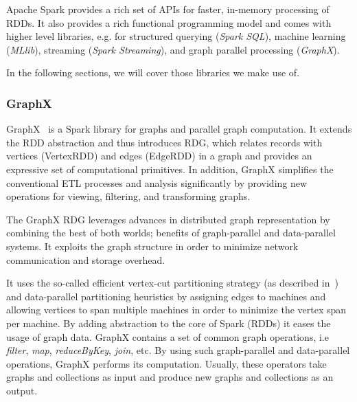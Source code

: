 Apache Spark provides a rich set of \gls{API}s for faster, in-memory processing of \gls{RDD}s.
It also provides a rich functional programming model and comes with higher level libraries, e.g. for structured querying (\textit{Spark SQL}), machine learning (\textit{MLlib}), streaming (\textit{Spark Streaming}), and graph parallel processing (\textit{GraphX}).

In the following sections, we will cover those libraries we make use of.

\subsubsection{GraphX}
GraphX~\cite{Gonzalez2014GraphX} is a Spark library for graphs and parallel graph computation.
It extends the \gls{RDD} abstraction and thus introduces \gls{RDG}, which relates records with vertices (VertexRDD) and edges (EdgeRDD) in a graph and provides an expressive set of computational primitives.
In addition, GraphX simplifies the conventional \gls{ETL} processes and analysis significantly by providing new operations for viewing, filtering, and transforming graphs.

The GraphX \gls{RDG} leverages advances in distributed graph representation by combining the best of both worlds; benefits of graph-parallel and data-parallel systems.
It exploits the graph structure in order to minimize network communication and storage overhead.

It uses the so-called efficient vertex-cut partitioning strategy (as described in~\cite{Gonzalez2012PowerGraph}) and data-parallel partitioning heuristics by assigning edges to machines and allowing vertices to span multiple machines in order to minimize the vertex span per machine.
By adding abstraction to the core of Spark (\gls{RDD}s) it eases the usage of graph data.
GraphX contains a set of common graph operations, i.e \textit{filter}, \textit{map}, \textit{reduceByKey}, \textit{join}, etc.
By using such graph-parallel and data-parallel operations, GraphX performs its computation.
Usually, these operators take graphs and collections as input and produce new graphs and collections as an output.


